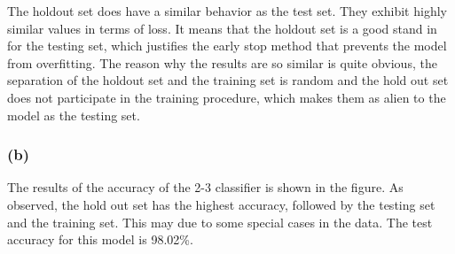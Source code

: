 \documentclass{article}
\begin{document}
The holdout set does have a similar behavior as the test set. They exhibit highly similar values in terms of loss. It means that the holdout set is a good stand in for the testing set, which justifies the early stop method that prevents the model from overfitting. The reason why the results are so similar is quite obvious, the separation of the holdout set and the training set is random and the hold out set does not participate in the training procedure, which makes them as alien to the model as the testing set. 

\subsubsection*{(b)}
The results of the accuracy of the 2-3 classifier is shown in the figure. As observed, the hold out set has the highest accuracy, followed by the testing set and the training set. This may due to some special cases in the data.
The test accuracy for this model is 98.02\%.
\end{document}
